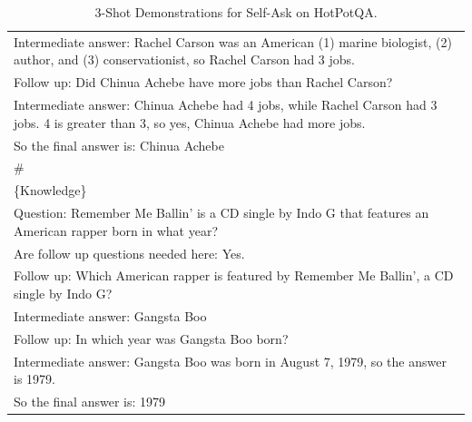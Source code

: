\begin{table}[t!]
{\begin{tabular}{p{\textwidth}}
Intermediate answer: Rachel Carson was an American (1) marine biologist, (2) author, and (3) conservationist, so Rachel Carson had 3 jobs.\\
Follow up: Did Chinua Achebe have more jobs than Rachel Carson?\\
Intermediate answer: Chinua Achebe had 4 jobs, while Rachel Carson had 3 jobs. 4 is greater than 3, so yes, Chinua Achebe had more jobs.\\
So the final answer is: Chinua Achebe\\
\#\\
\{Knowledge\}\\
Question: Remember Me Ballin' is a CD single by Indo G that features an American rapper born in what year?\\
Are follow up questions needed here: Yes.\\
Follow up: Which American rapper is featured by Remember Me Ballin', a CD single by Indo G?\\
Intermediate answer: Gangsta Boo\\
Follow up: In which year was Gangsta Boo born?\\
Intermediate answer: Gangsta Boo was born in August 7, 1979, so the answer is 1979.\\
So the final answer is: 1979\\
\bottomrule
\end{tabular}
}
\caption{3-Shot Demonstrations for Self-Ask on HotPotQA.}\label{tab:HotPotQA-self-ask}
\end{table}
\endgroup

